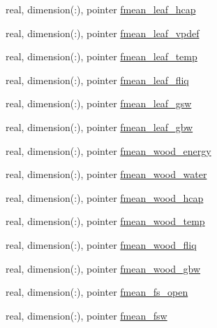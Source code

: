 \begin{DoxyCompactItemize}
\item 
real, dimension(\+:), pointer \hyperlink{structed__state__vars_1_1patchtype_a007b5f7deeadaf93978704c82d802165}{fmean\+\_\+leaf\+\_\+hcap}
\item 
real, dimension(\+:), pointer \hyperlink{structed__state__vars_1_1patchtype_a5d13f36e8b86e0a38ceef9e902953dfb}{fmean\+\_\+leaf\+\_\+vpdef}
\item 
real, dimension(\+:), pointer \hyperlink{structed__state__vars_1_1patchtype_a6d443a2756c958b71a153264deb4f2ae}{fmean\+\_\+leaf\+\_\+temp}
\item 
real, dimension(\+:), pointer \hyperlink{structed__state__vars_1_1patchtype_ac09a130b9a7b624630a19d7e228624ee}{fmean\+\_\+leaf\+\_\+fliq}
\item 
real, dimension(\+:), pointer \hyperlink{structed__state__vars_1_1patchtype_a8d5e6a7e56a9a0aa103b200791380e07}{fmean\+\_\+leaf\+\_\+gsw}
\item 
real, dimension(\+:), pointer \hyperlink{structed__state__vars_1_1patchtype_abbe47b608f7f08db678c6208bd8f9e21}{fmean\+\_\+leaf\+\_\+gbw}
\item 
real, dimension(\+:), pointer \hyperlink{structed__state__vars_1_1patchtype_a7522ef2f2ad4f45243eb65316e7af003}{fmean\+\_\+wood\+\_\+energy}
\item 
real, dimension(\+:), pointer \hyperlink{structed__state__vars_1_1patchtype_aaa141b7ad6740a32aa025d64a2d6be79}{fmean\+\_\+wood\+\_\+water}
\item 
real, dimension(\+:), pointer \hyperlink{structed__state__vars_1_1patchtype_ad73697cf6acd64c580d6d65172c8a885}{fmean\+\_\+wood\+\_\+hcap}
\item 
real, dimension(\+:), pointer \hyperlink{structed__state__vars_1_1patchtype_a49b4869606d44eb18778f11d9c201692}{fmean\+\_\+wood\+\_\+temp}
\item 
real, dimension(\+:), pointer \hyperlink{structed__state__vars_1_1patchtype_a18e5a3b528766ee482ad064458043d49}{fmean\+\_\+wood\+\_\+fliq}
\item 
real, dimension(\+:), pointer \hyperlink{structed__state__vars_1_1patchtype_a090d794370b14c572d6321f16ff8f891}{fmean\+\_\+wood\+\_\+gbw}
\item 
real, dimension(\+:), pointer \hyperlink{structed__state__vars_1_1patchtype_a223bd732e38909716be0f6235130b89c}{fmean\+\_\+fs\+\_\+open}
\item 
real, dimension(\+:), pointer \hyperlink{structed__state__vars_1_1patchtype_aaa39fed6d53926b9d497daa586b3d2d5}{fmean\+\_\+fsw}
\item 

\end{DoxyCompactItemize}
